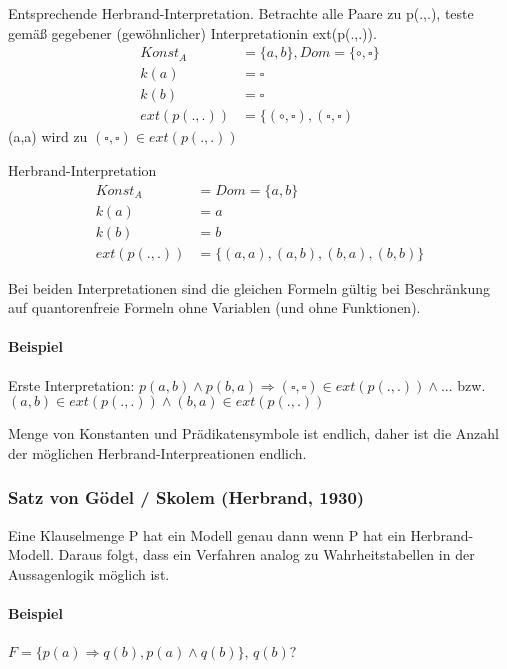 \documentclass[12pt, a4paper]{article}
\begin{document}
Entsprechende Herbrand-Interpretation. Betrachte alle Paare zu p(.,.), teste gemäß gegebener (gewöhnlicher) Interpretationin ext(p(.,.)).
\begin{equation}
\begin{split}
Konst_A &= \{ a,b \}, Dom = \{ \circ, \square \} \\
k(a) &= \square\\
k(b) &= \square \\
ext(p(.,.)) &=  \{ (\circ, \square), (\square, \square) 
\end{split}
\end{equation}
(a,a) wird zu $(\square, \square) \in ext(p(.,.))$

Herbrand-Interpretation
\begin{equation}
\begin{split}
Konst_A &= Dom = \{ a,b \} \\
k(a) &= a\\
k(b) &= b \\
ext(p(.,.)) &=  \{ (a,a), (a, b), (b,a), (b,b) \}
\end{split}
\end{equation}

Bei beiden Interpretationen sind die gleichen Formeln gültig bei Beschränkung auf quantorenfreie Formeln ohne Variablen (und ohne Funktionen).

\paragraph{Beispiel}

Erste Interpretation: $p(a,b) \wedge p(b,a) \Rightarrow (\square, \square) \in ext(p(.,.)) \wedge ...$ bzw. $(a,b) \in ext(p(.,.)) \wedge (b,a) \in ext(p(.,.))$

Menge von Konstanten und Prädikatensymbole ist endlich, daher ist die Anzahl der möglichen Herbrand-Interpreationen endlich.

\subsubsection*{Satz von Gödel / Skolem (Herbrand, 1930)}
Eine Klauselmenge P hat ein Modell genau dann wenn P hat ein Herbrand-Modell.
Daraus folgt, dass ein Verfahren analog zu Wahrheitstabellen in der Aussagenlogik möglich ist.

\paragraph{Beispiel}
$F = \{ p(a) \Rightarrow q(b), p(a) \wedge q(b) \}$, $q(b)?$
\end{document}
